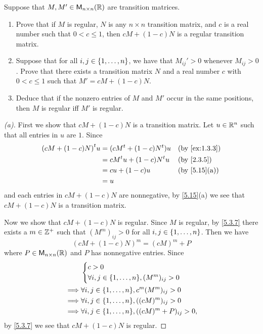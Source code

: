 \setcounter{ex}{18}
\begin{ex}\label{ex:5.3.19}
  Suppose that \(M, M' \in \mathsf{M}_{{n} \times n}({\mathbb{R}})\) are transition matrices.
  \begin{enumerate}
    \item Prove that if \(M\) is regular, \(N\) is any \(n \times n\) transition matrix, and \(c\) is a real number such that \(0 < c \leq 1\), then \(cM + (1 - c)N\) is a regular transition matrix.
    \item Suppose that for all \(i, j \in \left\lbrace1, \dots, n\right\rbrace\), we have that \(M_{i j}' > 0\) whenever \(M_{i j} > 0\).
          Prove that there exists a transition matrix \(N\) and a real number \(c\) with \(0 < c \leq 1\) such that \(M' = cM + (1 - c)N\).
    \item Deduce that if the nonzero entries of \(M\) and \(M'\) occur in the same positions, then \(M\) is regular iff \(M'\) is regular.
  \end{enumerate}
\end{ex}

\begin{proof}[(a)]
  First we show that \(cM + (1 - c)N\) is a transition matrix.
  Let \(u \in \mathbb{R}^n\) such that all entries in \(u\) are \(1\).
  Since
  \begin{align*}
    \tp{(cM + (1 - c)N)} u & = (c \tp{M} + (1 - c) \tp{N}) u &  & \text{(by \cref{ex:1.3.3})} \\
                           & = c \tp{M} u + (1 - c) \tp{N} u &  & \text{(by \cref{2.3.5})}    \\
                           & = c u + (1 - c) u               &  & \text{(by \cref{5.15}(a))}  \\
                           & = u
  \end{align*}
  and each entries in \(cM + (1 - c)N\) are nonnegative, by \cref{5.15}(a) we see that \(cM + (1 - c)N\) is a transition matrix.

  Now we show that \(cM + (1 - c)N\) is regular.
  Since \(M\) is regular, by \cref{5.3.7} there exists a \(m \in \mathbb{Z}^+\) such that \((M^m)_{i j} > 0\) for all \(i, j \in \left\lbrace1, \dots, n\right\rbrace\).
  Then we have
  \[
    (cM + (1 - c)N)^m = (cM)^m + P
  \]
  where \(P \in \mathsf{M}_{{n} \times n}({\mathbb{R}})\) and \(P\) has nonnegative entries.
  Since
  \begin{align*}
             & \begin{dcases}
                 c > 0 \\
                 \forall i, j \in \set{1, \dots, n}, (M^m)_{i j} > 0
               \end{dcases}          \\
    \implies & \forall i, j \in \set{1, \dots, n}, c^m (M^m)_{i j} > 0     \\
    \implies & \forall i, j \in \set{1, \dots, n}, ((cM)^m)_{i j} > 0      \\
    \implies & \forall i, j \in \set{1, \dots, n}, ((cM)^m + P)_{i j} > 0,
  \end{align*}
  by \cref{5.3.7} we see that \(cM + (1 - c)N\) is regular.
\end{proof}


